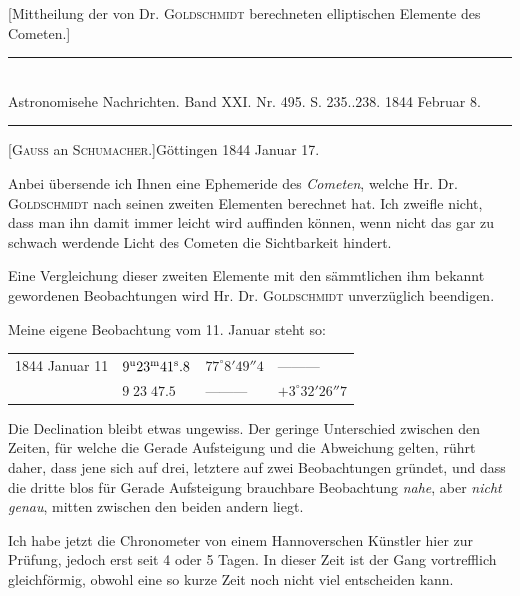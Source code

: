 [Mittheilung der von Dr. \textsc{Goldschmidt} berechneten elliptischen Elemente des Cometen.]

\clearpage
\hypertarget{native-469-letter}{}
\begin{center}
\rule{0.55\linewidth}{0.4pt}\\[2pt]
Astronomisehe Nachrichten. Band XXI. Nr. 495. S. 235..238. 1844 Februar 8.\\[2pt]
\rule{0.55\linewidth}{0.4pt}
\end{center}

\begin{center}[\textsc{Gauss} an \textsc{Schumacher.}]\quad Göttingen 1844 Januar 17.\end{center}

Anbei übersende ich Ihnen eine Ephemeride des \emph{Cometen}, welche Hr. Dr. \textsc{Goldschmidt} nach seinen zweiten Elementen berechnet hat. Ich zweifle nicht, dass man ihn damit immer leicht wird auffinden können, wenn nicht das gar zu schwach werdende Licht des Cometen die Sichtbarkeit hindert.

Eine Vergleichung dieser zweiten Elemente mit den sämmtlichen ihm bekannt gewordenen Beobachtungen wird Hr. Dr. \textsc{Goldschmidt} unverzüglich beendigen.

Meine eigene Beobachtung vom 11. Januar steht so:
\begin{center}
\begin{tabular}{l|l|l|l}
1844 Januar 11 & $9^{\rm u}23^{\rm m}41^{\rm s}.8$ & $77^\circ8'49''4$ & ---\quad ---\quad --- \\
 & $9\;23\;47.5$ & ---\quad ---\quad --- & $+3^\circ32'26''7$ \\
\end{tabular}
\end{center}

Die Declination bleibt etwas ungewiss. Der geringe Unterschied zwischen den Zeiten, für welche die Gerade Aufsteigung und die Abweichung gelten, rührt daher, dass jene sich auf drei, letztere auf zwei Beobachtungen gründet, und dass die dritte blos für Gerade Aufsteigung brauchbare Beobachtung \emph{nahe}, aber \emph{nicht genau}, mitten zwischen den beiden andern liegt.

Ich habe jetzt die Chronometer von einem Hannoverschen Künstler hier zur Prüfung, jedoch erst seit 4 oder 5 Tagen. In dieser Zeit ist der Gang vortrefflich gleichförmig, obwohl eine so kurze Zeit noch nicht viel entscheiden kann.

